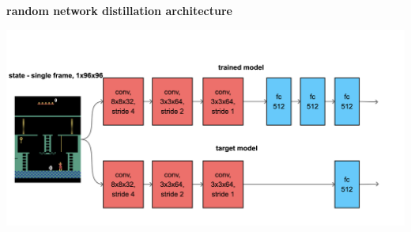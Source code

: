 \documentclass[xcolor=dvipsnames]{beamer}
\begin{document}
\begin{frame}{\bf random network distillation architecture}

\centering
\includegraphics[scale=0.12]{../diagrams/rnd/modelrnd.png}

\end{frame}
\end{document}
